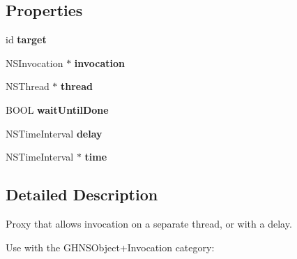 \subsection*{\-Properties}
\begin{DoxyCompactItemize}
\item 
\hypertarget{interface_g_h_n_s_invocation_proxy___g_h_u_n_i_t_ac472ed536f3514c2e052084f55dc00a9}{
id {\bfseries target}}
\label{interface_g_h_n_s_invocation_proxy___g_h_u_n_i_t_ac472ed536f3514c2e052084f55dc00a9}

\item 
\hypertarget{interface_g_h_n_s_invocation_proxy___g_h_u_n_i_t_a0e67e7e8c27eb32d5675ebed22fed828}{
\-N\-S\-Invocation $\ast$ {\bfseries invocation}}
\label{interface_g_h_n_s_invocation_proxy___g_h_u_n_i_t_a0e67e7e8c27eb32d5675ebed22fed828}

\item 
\hypertarget{interface_g_h_n_s_invocation_proxy___g_h_u_n_i_t_a6d4eb6e070861240c67c93cec082a9ca}{
\-N\-S\-Thread $\ast$ {\bfseries thread}}
\label{interface_g_h_n_s_invocation_proxy___g_h_u_n_i_t_a6d4eb6e070861240c67c93cec082a9ca}

\item 
\hypertarget{interface_g_h_n_s_invocation_proxy___g_h_u_n_i_t_aa0eb35fa62b79213edbe00da002f5039}{
\-B\-O\-O\-L {\bfseries wait\-Until\-Done}}
\label{interface_g_h_n_s_invocation_proxy___g_h_u_n_i_t_aa0eb35fa62b79213edbe00da002f5039}

\item 
\hypertarget{interface_g_h_n_s_invocation_proxy___g_h_u_n_i_t_a449ae77a95772d35e1ceb6a82d13c82f}{
\-N\-S\-Time\-Interval {\bfseries delay}}
\label{interface_g_h_n_s_invocation_proxy___g_h_u_n_i_t_a449ae77a95772d35e1ceb6a82d13c82f}

\item 
\hypertarget{interface_g_h_n_s_invocation_proxy___g_h_u_n_i_t_a01a94768b240188f3ce3d908a207ce95}{
\-N\-S\-Time\-Interval $\ast$ {\bfseries time}}
\label{interface_g_h_n_s_invocation_proxy___g_h_u_n_i_t_a01a94768b240188f3ce3d908a207ce95}

\end{DoxyCompactItemize}


\subsection{\-Detailed \-Description}
\-Proxy that allows invocation on a separate thread, or with a delay.

\-Use with the \-G\-H\-N\-S\-Object+\-Invocation category\-:



